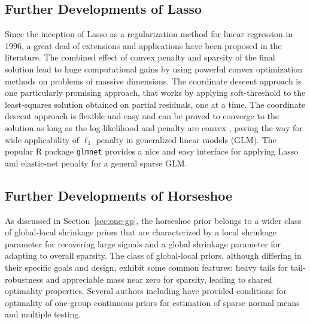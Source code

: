 \documentclass[sts,preprint]{imsart}
\begin{document}
\subsection{Further Developments of Lasso} Since the inception of Lasso as a regularization method for linear regression in 1996, a great deal of extensions and applications have been proposed in the literature. The combined effect of convex penalty and sparsity of the final solution lead to huge computational gains by using powerful convex optimization methods on problems of massive dimensions. The coordinate descent approach \citep{friedman_pathwise_2007, friedman2010regularization} is one particularly promising approach, that works by applying soft-threshold to the least-squares solution obtained on partial residuals, one at a time. The coordinate descent approach is flexible and easy and can be proved to converge to the solution as long as the log-likelihood and penalty are convex \citep{tseng2001convergence}, paving the way for wide applicability of $\ell_1$ penalty in generalized linear models (GLM). The popular R package \texttt{glmnet} provides a nice and easy interface for applying Lasso and elastic-net penalty for a general sparse GLM.


\subsection{Further Developments of Horseshoe}

As discussed in Section~\ref{sec:one-gp}, the horseshoe prior belongs to a wider class of global-local shrinkage priors \citep{polson2010shrink} that are characterized by a local shrinkage parameter for recovering large signals and a global shrinkage parameter for adapting to overall sparsity. The class of global-local priors, although differing in their specific goals and design, exhibit some common features: heavy tails for tail-robustness and appreciable mass near zero for sparsity, leading to shared optimality properties. Several authors including \citet{van2015conditions, ghosh2016asymptotic, ghosh2016testing} have provided conditions for optimality of one-group continuous priors for estimation of sparse normal means and multiple testing. 
\end{document}
